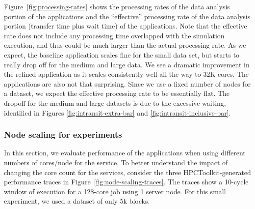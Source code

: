 Figure~\ref{fig:processing-rates} shows the processing rates of the
data analysis portion of the \intransit applications and the ``effective''
processing rate of the data analysis portion (transfer time plus wait time) of
the \intransit applications.  Note that the effective \intransit rate does
not include any processing time overlapped with the simulation execution,
and thus could be much larger than the actual processing rate.  As we
expect, the baseline application scales fine for the small data set, but
starts to really drop off for the medium and large data.  We see a dramatic
improvement in the \insitu refined application as it scales consistently
well all the way to 32K cores.  The \intransit applications are also not
that surprising.  Since we use a fixed number of nodes for a dataset, we
expect the effective processing rate to be essentially flat.  The dropoff
for the medium and large datasets is due to the excessive waiting,
identified in Figures \ref{fig:intransit-extra-bar} and
\ref{fig:intransit-inclusive-bar}.



\subsubsection{Node scaling for \intransit experiments}

In this section, we evaluate performance of the \intransit applications when
using different numbers of cores/node for the \intransit service.  To better
understand the impact of changing the core count for the services, consider the
three HPCToolkit-generated performance traces in
Figure~\ref{fig:node-scaling-traces}.  The traces show a 10-cycle window
of execution for a 128-core job using 1 server node. For this small experiment,
we used a dataset of only 5k blocks.

